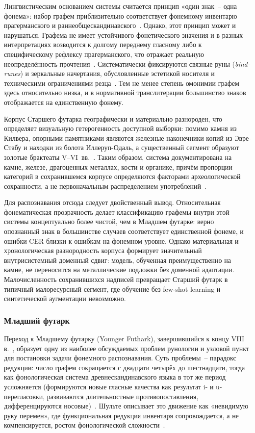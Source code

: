 \documentclass[a4paper,12pt]{extarticle}
\begin{document}
Лингвистическим основанием системы считается принцип «один знак~-- одна фонема»: набор графем приблизительно соответствует фонемному инвентарю прагерманского и раннеобщескандинавского~\cite{antonsen1975,looijenga2003}. Однако, этот принцип может и нарушаться. Графема  не имеет устойчивого фонетического значения и в разных интерпретациях возводится к долгому переднему гласному либо к специфическому рефлексу прагерманского, что отражает реальную неопределённость прочтения~\cite{krause1966,barnes2012}. Систематически фиксируются связные руны (\textit{bind-runes}) и зеркальные начертания, обусловленные эстетикой носителя и техническими ограничениями резца~\cite{looijenga2003}. Тем не менее степень омонимии графем здесь относительно низка, и в нормативной транслитерации большинство знаков отображается на единственную фонему.
 
Корпус Старшего футарка географически и материально разнороден, что определяет визуальную гетерогенность доступной выборки: помимо камня из Килвера, опорными памятниками являются железные наконечники копий из Эвре-Стабу и находки из болота Иллеруп-Одаль, а существенный сегмент образуют золотые брактеаты V--VI~вв.~\cite{looijenga2003,duwel2008}. Таким образом, система документирована на камне, железе, драгоценных металлах, кости и органике, причём пропорции категорий в сохранившемся корпусе определяются факторами археологической сохранности, а не первоначальным распределением употреблений~\cite{looijenga2003,barnes2012}.
 
Для распознавания отсюда следует двойственный вывод. Относительная фонематическая прозрачность делает классификацию графемы внутри этой системы концептуально более чистой, чем в Младшем футарке: верно опознанный знак в большинстве случаев соответствует единственной фонеме, и ошибки CER близки к ошибкам на фонемном уровне. Однако материальная и хронологическая разнородность корпуса формирует значительный внутрисистемный доменный сдвиг: модель, обученная преимущественно на камне, не переносится на металлические подложки без доменной адаптации. Малочисленность сохранившихся надписей превращает Старший футарк в типичный малоресурсный сегмент, где обучение без few-shot learning и синтетической аугментации невозможно.
 
\subsubsection{Младший футарк}
 
Переход к Младшему футарку (Younger Futhark), завершившийся к концу VIII в.~\cite{schulte2011,stoklund2010}, образует одну из наиболее обсуждаемых проблем рунологии и узловой пункт для постановки задачи фонемного распознавания. Суть проблемы~-- парадокс редукции: число графем сокращается с двадцати четырёх до шестнадцати, тогда как фонологическая система древнескандинавского языка в тот же период усложняется (формируются новые гласные качества как результат i- и u-перегласовки, развиваются длительностные противопоставления, дифференцируются носовые)~\cite{schulte2011,barnes2012}. Шульте описывает это движение как «невидимую руку перемен», где функциональная редукция инвентаря сопровождается, а не компенсируется, ростом фонологической сложности~\cite{schulte2011}.
 
\end{document}
